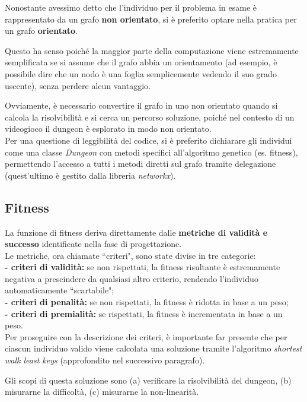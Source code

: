 \documentclass[12pt,titlepage]{article}
\begin{document}
Nonostante avessimo detto che l'individuo per il problema in esame è rappresentato da un grafo \textbf{non orientato}, si è preferito optare nella pratica per un grafo \textbf{orientato}.

Questo ha senso poiché la maggior parte della computazione viene estremamente semplificata se si assume che il grafo abbia un orientamento (ad esempio, è possibile dire che un nodo è una foglia semplicemente vedendo il suo grado uscente), senza perdere alcun vantaggio.

Ovviamente, è necessario convertire il grafo in uno non orientato quando si calcola la risolvibilità e si cerca un percorso soluzione, poiché nel contesto di un videogioco il dungeon è esplorato in modo non orientato. \\

\noindent Per una questione di leggibilità del codice, si è preferito dichiarare gli individui come una classe \textit{Dungeon} con metodi specifici all'algoritmo genetico (es. fitness), permettendo l'accesso a tutti i metodi diretti sul grafo tramite delegazione (quest'ultimo è gestito dalla libreria \textit{networkx}).

\subsection {Fitness}

La funzione di fitness deriva direttamente dalle \textbf{metriche di validità e successo} identificate nella fase di progettazione.\\

\noindent Le metriche, ora chiamate ``criteri", sono state divise in tre categorie:\\
\textbf{- criteri di validità:} se non rispettati, la fitness risultante è estremamente negativa a prescindere da qualsiasi altro criterio, rendendo l'individuo automaticamente ``scartabile";\\
\textbf{- criteri di penalità:} se non rispettati, la fitness è ridotta in base a un peso;\\
\textbf{- criteri di premialità:} se rispettati, la fitness è incrementata in base a un peso.\\

\noindent Per proseguire con la descrizione dei criteri, è importante far presente che per ciascun individuo valido viene calcolata una soluzione tramite l'algoritmo \textit{shortest walk least keys} (approfondito nel successivo paragrafo).

Gli scopi di questa soluzione sono (a) verificare la risolvibilità del dungeon, (b) misurarne la difficoltà, (c) misurarne la non-linearità.
\end{document}
